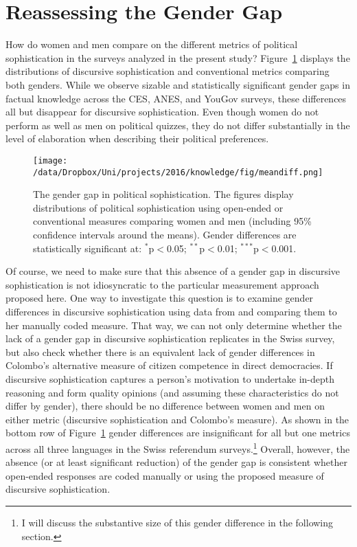 \section*{Reassessing the Gender Gap}
How do women and men compare on the different metrics of political sophistication in the surveys analyzed in the present study? Figure~\ref{fig:meandiff} displays the distributions of discursive sophistication and conventional metrics comparing both genders. While we observe sizable and statistically significant gender gaps in factual knowledge across the CES, ANES, and YouGov surveys, these differences all but disappear for discursive sophistication. Even though women do not perform as well as men on political quizzes, they do not differ substantially in the level of elaboration when describing their political preferences.

\begin{figure}[ht]\centering
	\texttt{[image: /data/Dropbox/Uni/projects/2016/knowledge/fig/meandiff.png]}
	\caption[The gender gap in political sophistication]{The gender gap in political sophistication. The figures display distributions of political sophistication using open-ended or conventional measures comparing women and men (including 95\% confidence intervals around the means). Gender differences are statistically significant at:  $^{*}$p$<$0.05; $^{**}$p$<$0.01; $^{***}$p$<$0.001.}\label{fig:meandiff}
\end{figure}

\clearpage

Of course, we need to make sure that this absence of a gender gap in discursive sophistication is not idiosyncratic to the particular measurement approach proposed here. One way to investigate this question is to examine gender differences in discursive sophistication using data from \citet{colombo2016justifications} and comparing them to her manually coded measure. That way, we can not only determine whether the lack of a gender gap in discursive sophistication replicates in the Swiss survey, but also check whether there is an equivalent lack of gender differences in Colombo's alternative measure of citizen competence in direct democracies. If discursive sophistication captures a person's motivation to undertake in-depth reasoning and form quality opinions (and assuming these characteristics do not differ by gender), there should be no difference between women and men on either metric (discursive sophistication and Colombo's measure). As shown in the bottom row of Figure~\ref{fig:meandiff} gender differences are insignificant for all but one metrics across all three languages in the Swiss referendum surveys.\footnote{I will discuss the substantive size of this gender difference in the following section.} Overall, however, the absence (or at least significant reduction) of the gender gap is consistent whether open-ended responses are coded manually or using the proposed measure of discursive sophistication.

